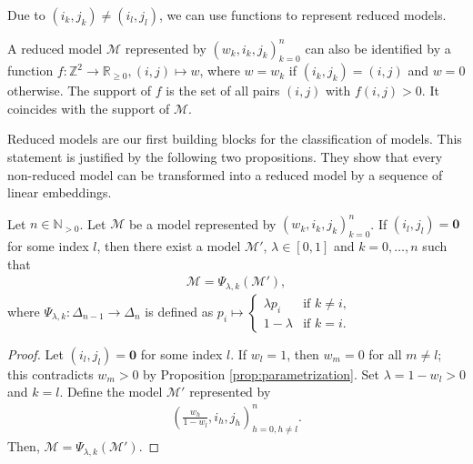 Due to \( (i_k, j_k) \neq (i_l, j_l) \), we can use functions to represent reduced models.

\begin{remark}\label{rem:representation-of-models-by-functions}
    A reduced model \( \mathcal{M} \) represented by \( (w_k, i_k, j_k)_{k=0}^n \) can also be identified by a function \( f: \mathbb{Z}^2 \to \mathbb{R}_{\geq 0}, (i, j) \mapsto w \), where \( w = w_k \) if \( (i_k, j_k) = (i, j) \) and \( w = 0 \) otherwise. The support of \( f \) is the set of all pairs \( (i, j) \) with \( f(i, j) > 0 \). It coincides with the support of \( \mathcal{M} \).
\end{remark}


Reduced models are our first building blocks for the classification of models. This statement is justified by the following two propositions. They show that every non-reduced model can be transformed into a reduced model by a sequence of linear embeddings.

\begin{proposition}\label{prop:linear-embedding-1}
    Let \( n \in \mathbb{N}_{>0} \).
    Let \( \mathcal{M} \) be a model represented by \( (w_k, i_k, j_k)_{k=0}^n \). If \( (i_l, j_l) = \mathbf{0} \) for some index \( l \), then there exist a model \( \mathcal{M}' \), \( \lambda \in [0,1] \) and \( k = 0, \dots, n \) such that
    \begin{align*}
        \mathcal{M} = \Psi_{\lambda,k}(\mathcal{M}'),
    \end{align*}
    where \( \Psi_{\lambda, k}: \Delta_{n-1} \to \Delta_n \) is defined as \(  p_i \mapsto \begin{cases}
        \lambda p_i & \text{if } k \neq i, \\
        1-\lambda & \text{if } k = i.
    \end{cases} \)
\end{proposition}

\begin{proof}
    Let \( (i_l, j_l) = \mathbf{0} \) for some index \( l \). If \( w_l = 1 \), then \( w_m = 0 \) for all \( m \neq l \); this contradicts \( w_m > 0 \) by Proposition \ref{prop:parametrization}. Set \( \lambda = 1 - w_l > 0 \) and \( k = l \). Define the model \( \mathcal{M}' \) represented by 
    \begin{align*}
        \left(\frac{w_h}{1-w_l}, i_h, j_h\right)^n_{h=0, h \neq l}.
    \end{align*}
    Then, \( \mathcal{M} = \Psi_{\lambda,k}(\mathcal{M}') \).
\end{proof}


